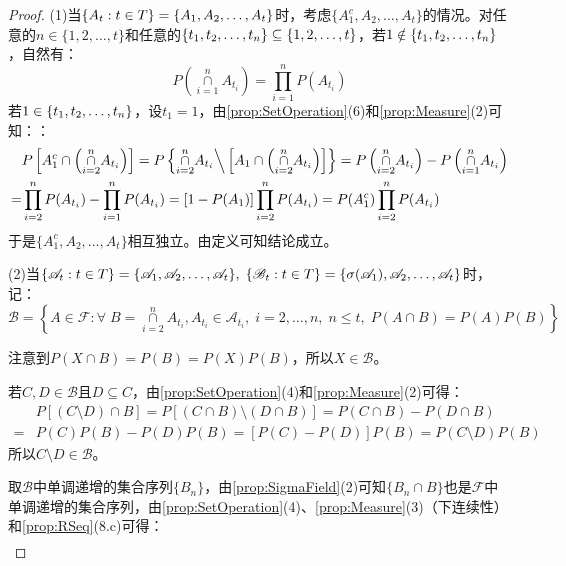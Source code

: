 \begin{proof}
	(1)当$\{A_t:t\in T\}=\{A_1, A_2, \dots, A_{t}\}$时，考虑$\{A_1^c,A_2,\dots,A_t\}$的情况。对任意的$n\in\{1,2,\dots,t\}$和任意的$\{t_1, t_2, \dots, t_{n}\}\subseteq\{1,2,\dots,t\}$，若$1\notin\{t_1, t_2, \dots, t_{n}\}$，自然有：
	\begin{equation*}
		P\left(\underset{i=1}{\overset{n}{\cap}}A_{t_i}\right)=\prod_{i=1}^{n}P(A_{t_i})
	\end{equation*}
	若$1\in\{t_1, t_2, \dots, t_{n}\}$，设$t_1=1$，由\cref{prop:SetOperation}(6)和\cref{prop:Measure}(2)可知：：
	\begin{align*}
		&P\left[A_1^c\cap\left(\underset{i=2}{\overset{n}{\cap}}A_{t_i}\right)\right]=P\left\{\underset{i=2}{\overset{n}{\cap}}A_{t_i}\Big\backslash\left[A_1\cap\left(\underset{i=2}{\overset{n}{\cap}}A_{t_i}\right)\right]\right\}=P\left(\underset{i=2}{\overset{n}{\cap}}A_{t_i}\right)-P\left(\underset{i=1}{\overset{n}{\cap}}A_{t_i}\right) \\
		=&\prod_{i=2}^{n}P(A_{t_i})-\prod_{i=1}^{n}P(A_{t_i})=[1-P(A_1)]\prod_{i=2}^{n}P(A_{t_i})=P(A_1^c)\prod_{i=2}^{n}P(A_{t_i})
	\end{align*}
	于是$\{A_1^c,A_2,\dots,A_t\}$相互独立。由定义可知结论成立。\par
	(2)当$\{\mathscr{A}_t:t\in T\}=\{\mathscr{A}_1, \mathscr{A}_2, \dots, \mathscr{A}_{t}\},\;\{\mathscr{B}_t:t\in T\}=\{\sigma(\mathscr{A}_1),\mathscr{A}_2,\dots,\mathscr{A}_t\}$时，记：
	\begin{equation*}
		\mathscr{B}=\left\{A\in\mathscr{F}:\forall\;B=\underset{i=2}{\overset{n}{\cap}}A_{t_i},A_{t_i}\in\mathscr{A}_{t_i},\;i=2,\dots,n,\;n\leqslant t,\;P(A\cap B)=P(A)P(B)\right\}
	\end{equation*}\par
	注意到$P(X\cap B)=P(B)=P(X)P(B)$，所以$X\in\mathscr{B}$。\par
	若$C,D\in\mathscr{B}$且$D\subseteq C$，由\cref{prop:SetOperation}(4)和\cref{prop:Measure}(2)可得：
	\begin{align*}
		&P[(C\setminus D)\cap B]=P[(C\cap B)\setminus(D\cap B)]=P(C\cap B)-P(D\cap B) \\
		=&P(C)P(B)-P(D)P(B)=[P(C)-P(D)]P(B)=P(C\setminus D)P(B)
	\end{align*}
	所以$C\setminus D\in\mathscr{B}$。\par
	取$\mathscr{B}$中单调递增的集合序列$\{B_n\}$，由\cref{prop:SigmaField}(2)可知$\{B_n\cap B\}$也是$\mathscr{F}$中单调递增的集合序列，由\cref{prop:SetOperation}(4)、\cref{prop:Measure}(3)（下连续性）和\cref{prop:RSeq}(8.c)可得：
	\begin{align*}

\end{align*}
\end{proof}
